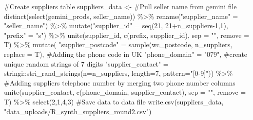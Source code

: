 \documentclass[
  letterpaper,
  DIV=11,
  numbers=noendperiod]{scrartcl}
\newenvironment{Shaded}{\begin{snugshade}}{\end{snugshade}}
\newcommand{\AttributeTok}[1]{\textcolor[rgb]{0.40,0.45,0.13}{#1}}
\newcommand{\CommentTok}[1]{\textcolor[rgb]{0.37,0.37,0.37}{#1}}
\newcommand{\DecValTok}[1]{\textcolor[rgb]{0.68,0.00,0.00}{#1}}
\newcommand{\FunctionTok}[1]{\textcolor[rgb]{0.28,0.35,0.67}{#1}}
\newcommand{\NormalTok}[1]{\textcolor[rgb]{0.00,0.23,0.31}{#1}}
\newcommand{\OtherTok}[1]{\textcolor[rgb]{0.00,0.23,0.31}{#1}}
\newcommand{\SpecialCharTok}[1]{\textcolor[rgb]{0.37,0.37,0.37}{#1}}
\newcommand{\StringTok}[1]{\textcolor[rgb]{0.13,0.47,0.30}{#1}}
\begin{document}
\begin{Shaded}
\begin{Highlighting}[numbers=left,,]
\CommentTok{\#Create suppliers table}
\NormalTok{suppliers\_data }\OtherTok{\textless{}{-}} 
  \CommentTok{\#Pull seller name from gemini file}
  \FunctionTok{distinct}\NormalTok{(}\FunctionTok{select}\NormalTok{(gemini\_prods, seller\_name)) }\SpecialCharTok{\%\textgreater{}\%}
  \FunctionTok{rename}\NormalTok{(}\StringTok{"supplier\_name"} \OtherTok{=} \StringTok{"seller\_name"}\NormalTok{) }\SpecialCharTok{\%\textgreater{}\%}
  \FunctionTok{mutate}\NormalTok{(}\StringTok{"supplier\_id"} \OtherTok{=} \FunctionTok{seq}\NormalTok{(}\DecValTok{21}\NormalTok{, }\DecValTok{21}\SpecialCharTok{+}\NormalTok{n\_suppliers}\DecValTok{{-}1}\NormalTok{,}\DecValTok{1}\NormalTok{),}
         \StringTok{"prefix"} \OtherTok{=} \StringTok{"s"}\NormalTok{) }\SpecialCharTok{\%\textgreater{}\%}
  \FunctionTok{unite}\NormalTok{(supplier\_id, }\FunctionTok{c}\NormalTok{(prefix, supplier\_id), }\AttributeTok{sep =} \StringTok{""}\NormalTok{, }\AttributeTok{remove =}\NormalTok{ T) }\SpecialCharTok{\%\textgreater{}\%}
  \FunctionTok{mutate}\NormalTok{(}
    \StringTok{"supplier\_postcode"} \OtherTok{=}
      \FunctionTok{sample}\NormalTok{(wc\_postcode, n\_suppliers, }\AttributeTok{replace =}\NormalTok{ T),}
    \CommentTok{\#Adding the phone code in UK}
    \StringTok{"phone\_domain"} \OtherTok{=} \StringTok{"079"}\NormalTok{,}
    \CommentTok{\#create unique random strings of 7 digits}
    \StringTok{"supplier\_contact"} \OtherTok{=} 
\NormalTok{      stringi}\SpecialCharTok{::}\FunctionTok{stri\_rand\_strings}\NormalTok{(}\AttributeTok{n=}\NormalTok{n\_suppliers, }\AttributeTok{length=}\DecValTok{7}\NormalTok{, }\AttributeTok{pattern=}\StringTok{"[0{-}9]"}\NormalTok{)) }\SpecialCharTok{\%\textgreater{}\%}
  \CommentTok{\#Adding supplier\textquotesingle{}s telephone number by merging two phone number columns}
  \FunctionTok{unite}\NormalTok{(supplier\_contact, }
        \FunctionTok{c}\NormalTok{(phone\_domain, supplier\_contact), }\AttributeTok{sep =} \StringTok{""}\NormalTok{, }\AttributeTok{remove =}\NormalTok{ T) }\SpecialCharTok{\%\textgreater{}\%}
  \FunctionTok{select}\NormalTok{(}\DecValTok{2}\NormalTok{,}\DecValTok{1}\NormalTok{,}\DecValTok{4}\NormalTok{,}\DecValTok{3}\NormalTok{)}
\CommentTok{\#Save data to data file}
\FunctionTok{write.csv}\NormalTok{(suppliers\_data, }\StringTok{"data\_uploads/R\_synth\_suppliers\_round2.csv"}\NormalTok{)}


\end{Highlighting}
\end{Shaded}
\end{document}
